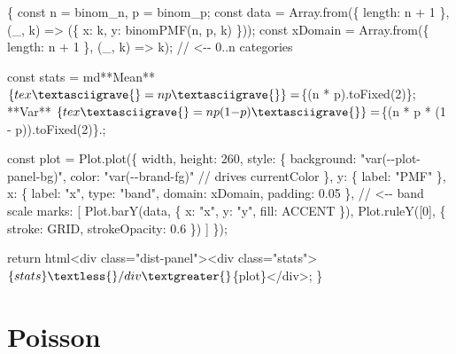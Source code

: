 \documentclass[
  letterpaper,
  DIV=11,
  numbers=noendperiod]{scrreprt}
\newenvironment{Shaded}{\begin{snugshade}}{\end{snugshade}}
\newcommand{\NormalTok}[1]{\textcolor[rgb]{0.00,0.23,0.31}{#1}}
\theoremstyle{definition}
\theoremstyle{plain}
\theoremstyle{definition}
\theoremstyle{remark}
\begin{document}
\begin{Shaded}
\begin{Highlighting}[]

\NormalTok{\{}
\NormalTok{  const n = binom\_n, p = binom\_p;}
\NormalTok{  const data = Array.from(\{ length: n + 1 \}, (\_, k) =\textgreater{} (\{ x: k, y: binomPMF(n, p, k) \}));}
\NormalTok{  const xDomain = Array.from(\{ length: n + 1 \}, (\_, k) =\textgreater{} k);  // \textless{}{-}{-} 0..n categories}

\NormalTok{  const stats = md\textasciigrave{}**Mean** $\{tex\textasciigrave{}= np\textasciigrave{}\} = $\{(n * p).toFixed(2)\}; }
\NormalTok{  **Var** $\{tex\textasciigrave{}= np(1{-}p)\textasciigrave{}\} = $\{(n * p * (1 {-} p)).toFixed(2)\}.\textasciigrave{};}

\NormalTok{  const plot = Plot.plot(\{}
\NormalTok{        width, height: 260,}
\NormalTok{    style: \{}
\NormalTok{    background: "var({-}{-}plot{-}panel{-}bg)",}
\NormalTok{    color: "var({-}{-}brand{-}fg)"           // drives \textquotesingle{}currentColor\textquotesingle{}}
\NormalTok{    \},}
\NormalTok{    y: \{ label: "PMF" \},}
\NormalTok{    x: \{ label: "x", type: "band", domain: xDomain, padding: 0.05 \},  // \textless{}{-}{-} band scale}
\NormalTok{    marks: [}
\NormalTok{      Plot.barY(data, \{ x: "x", y: "y", fill: ACCENT \}),}
\NormalTok{      Plot.ruleY([0], \{ stroke: GRID, strokeOpacity: 0.6 \})}
\NormalTok{    ]}
\NormalTok{  \});}

\NormalTok{  return html\textasciigrave{}\textless{}div class="dist{-}panel"\textgreater{}\textless{}div class="stats"\textgreater{}$\{stats\}\textless{}/div\textgreater{}$\{plot\}\textless{}/div\textgreater{}\textasciigrave{};}
\NormalTok{\}}
\end{Highlighting}
\end{Shaded}

\begin{Shaded}
\end{Shaded}

\section{Poisson}
\end{document}

